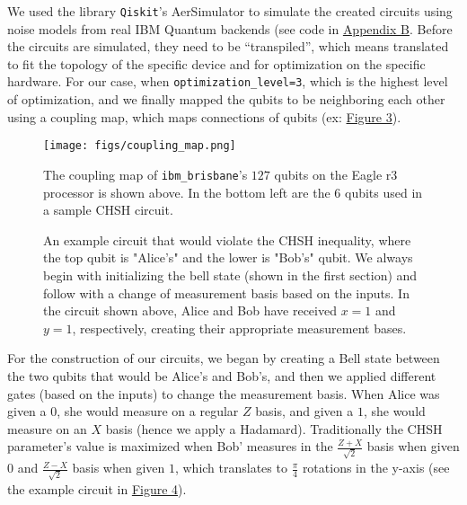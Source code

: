 \documentclass[a4paper, onecolumn, 11pt, titlepage]{quantumarticle}
\begin{document}
We used the library \verb|Qiskit|’s AerSimulator \cite{qiskit2024} to simulate the created circuits using noise models from real IBM Quantum backends (see code in \hyperref[secondappendix]{Appendix B}. Before the circuits are simulated, they need to be “transpiled”, which means translated to fit the topology of the specific device and for optimization on the specific hardware. For our case, when \verb|optimization_level=3|, which is the highest level of optimization, and we finally mapped the qubits to be neighboring each other using a coupling map, which maps connections of qubits (ex: \hyperref[fig:coupling-map]{Figure 3}). 

\begin{figure}
    \centering
    \texttt{[image: figs/coupling\_map.png]}
    \caption{The coupling map of \texttt{ibm\_brisbane}'s  $127$ qubits on the Eagle r3 processor is shown above. In the bottom left are the $6$ qubits used in a sample CHSH circuit.}
    \label{fig:coupling-map}
\end{figure}


\begin{figure}
    \centering
    \scalebox{1.25}{
        \[
            \Qcircuit @C=1em @R=1em {
            \lstick{\left| 0 \right\rangle} & \gate{H}  & \ctrl{1} \barrier[0em]{1} & \qw & \gate{H}  \barrier[0em]{1} & \qw & \meter  \\
            \lstick{\left| 0 \right\rangle} & \qw & \targ & \qw & \gate{R_y(\phi)} & \qw  &  \qw & \meter \\
            & \cw & \cw & \cw & \cw & \cw & \cw \cwx[-2] & \cw \cwx[-1] & \cw \\
            }
        \] 
    }
    \caption{An example circuit that would violate the CHSH inequality, where the top qubit is "Alice's" and the lower is "Bob's" qubit. We always begin with initializing the bell state (shown in the first section) and follow with a change of measurement basis based on the inputs. In the circuit shown above, Alice and Bob have received $x = 1$ and $y = 1$, respectively, creating their appropriate measurement bases. }
    \label{fig:circuit-basic}
\end{figure}

For the construction of our circuits, we began by creating a Bell state between the two qubits that would be Alice's and Bob’s, and then we applied different gates (based on the inputs) to change the measurement basis. When Alice was given a $0$, she would measure on a regular $Z$ basis, and given a $1$, she would measure on an $X$ basis (hence we apply a Hadamard). Traditionally the CHSH parameter’s value is maximized when Bob’ measures in the $\frac{Z+X}{\sqrt2}$ basis when given $0$ and $\frac{Z-X}{\sqrt2}$ basis when given $1$, which translates to $\frac{\pi}{4}$ rotations in the y-axis (see the example circuit in \hyperref[fig:circuit-basic]{Figure 4}). 
\end{document}
